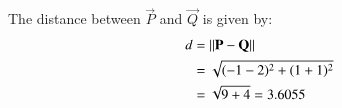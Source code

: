 The distance between $\vec{P}$ and $\vec{Q}$ is given
by:
\begin{align}
  d &= \left\lVert\mathbf{P} - \mathbf{Q}\right\rVert \\
   &= \sqrt{(-1-2)^{2} + (1+1)^{2}}\\
   &= \sqrt{9+4}
  = 3.6055
\end{align}